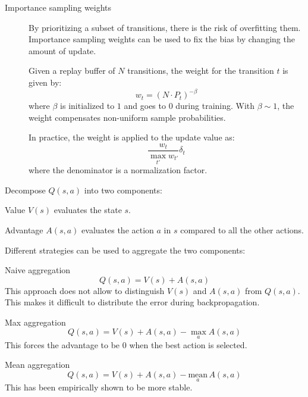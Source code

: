 \begin{description}
        \begin{description}
            \item[Importance sampling weights]
                By prioritizing a subset of transitions, there is the risk of overfitting them. Importance sampling weights can be used to fix the bias by changing the amount of update.

                Given a replay buffer of $N$ transitions, the weight for the transition $t$ is given by:
                \[ w_t = (N \cdot P_t)^{-\beta} \]
                where $\beta$ is initialized to $1$ and goes to $0$ during training. With $\beta \sim 1$, the weight compensates non-uniform sample probabilities.
                
                In practice, the weight is applied to the update value as:
                \[ \frac{w_t}{\max_{t'} w_{t'}} \delta_t \]
                where the denominator is a normalization factor.
        \end{description}


    \item[Dueling] 
        Decompose $Q(s, a)$ into two components:
        \begin{descriptionlist}
            \item[Value] $V(s)$ evaluates the state $s$.
            \item[Advantage] $A(s, a)$ evaluates the action $a$ in $s$ compared to all the other actions.
        \end{descriptionlist}

        Different strategies can be used to aggregate the two components:
        \begin{descriptionlist}
            \item[Naive aggregation]
                \[ Q(s, a) = V(s) + A(s, a) \]
                This approach does not allow to distinguish $V(s)$ and $A(s, a)$ from $Q(s, a)$. This makes it difficult to distribute the error during backpropagation.

            \item[Max aggregation]
                \[ Q(s, a) = V(s) + A(s, a) - \max_a A(s, a) \]
                This forces the advantage to be $0$ when the best action is selected.

            \item[Mean aggregation]
                \[ Q(s, a) = V(s) + A(s, a) - \underset{a}{\text{mean}}\, A(s, a) \]
                This has been empirically shown to be more stable.
        \end{descriptionlist}


\end{description}
